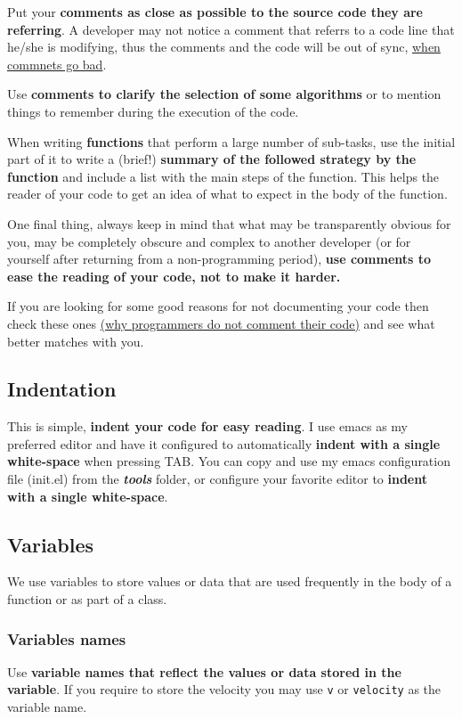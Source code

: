 \documentclass[11pt]{article}
\begin{document}
Put your \textbf{comments as close as possible to the source code they are
referring}. A developer may not notice a comment that referrs to a
code line that he/she is modifying, thus the comments and the code
will be out of sync, \href{http://blog.codinghorror.com/when-good-comments-go-bad}{when commnets go bad}.

Use \textbf{comments to clarify the selection of some algorithms} or to
mention things to remember during the execution of the code.

When writing \textbf{functions} that perform a large number of sub-tasks, use
the initial part of it to write a (brief!) \textbf{summary of the followed
strategy by the function} and include a list with the main steps of
the function. This helps the reader of your code to get an idea of
what to expect in the body of the function.

One final thing, always keep in mind that what may be transparently
obvious for you, may be completely obscure and complex to another
developer (or for yourself after returning from a non-programming
period), \textbf{use comments to ease the reading of your code, not to make
it harder.}

If you are looking for some good reasons for not documenting your code
then check these ones \href{http://everything2.com/index.pl?node\_id=1709851\&displaytype=printable}{(why programmers do not comment their code)} and
see what better matches with you.

\subsection{Indentation}
\label{sec:orgba77122}
This is simple, \textbf{indent your code for easy reading}. I use emacs as my
preferred editor and have it configured to automatically \textbf{indent with
a single white-space} when pressing TAB. You can copy and use my emacs
configuration file (init.el) from the \textbf{\emph{tools}} folder, or configure
your favorite editor to \textbf{indent with a single white-space}.

\subsection{Variables}
\label{sec:orgb85970c}
We use variables to store values or data that are used frequently in
the body of a function or as part of a class.

\subsubsection{Variables names}
\label{sec:orgc2b224c}
Use \textbf{variable names that reflect the values or data stored in the
variable}. If you require to store the velocity you may use \texttt{v} or
\texttt{velocity} as the variable name.
\end{document}

